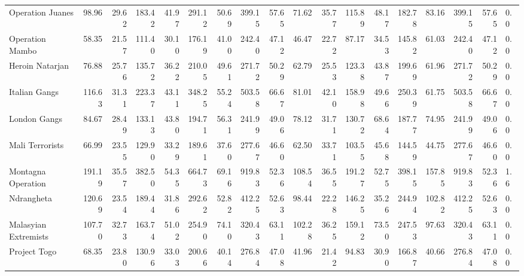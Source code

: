 \begin{tabular}{lrrrrrrrrrrrrrrrrl}
Operation Juanes     &             98.96 &  29.62 &  183.42 &  41.97 &  291.12 &  50.69 &  399.15 &  57.65 &            71.62 &   35.77 &  115.89 &   48.17 &  182.78 &   83.16 &  399.15 &  57.65 &        0.0 \\
Operation Mambo      &             58.35 &  21.57 &  111.40 &  30.10 &  176.19 &  41.00 &  242.40 &  47.12 &            46.47 &   22.72 &   87.17 &   34.53 &  145.82 &   61.03 &  242.40 &  47.12 &        0.0 \\
Heroin Natarjan      &             76.88 &  25.76 &  135.72 &  36.22 &  210.05 &  49.61 &  271.72 &  50.29 &            62.79 &   25.53 &  123.38 &   43.87 &  199.69 &   61.96 &  271.72 &  50.29 &        0.0 \\
Italian Gangs        &            116.63 &  31.31 &  223.37 &  43.11 &  348.25 &  55.24 &  503.58 &  66.67 &            81.01 &   42.10 &  158.98 &   49.66 &  250.39 &   61.75 &  503.58 &  66.67 &        0.0 \\
London Gangs         &             84.67 &  28.49 &  133.13 &  43.80 &  194.71 &  56.31 &  241.99 &  49.06 &            78.12 &   31.71 &  130.72 &   68.64 &  187.77 &   74.95 &  241.99 &  49.06 &        0.0 \\
Mali Terrorists      &             66.99 &  23.55 &  129.90 &  33.29 &  189.61 &  37.60 &  277.67 &  46.60 &            62.50 &   33.71 &  103.55 &   45.68 &  144.59 &   44.75 &  277.67 &  46.60 &        0.0 \\
Montagna Operation   &            191.19 &  35.57 &  382.50 &  54.35 &  664.73 &  69.16 &  919.83 &  52.36 &           108.54 &   36.55 &  191.27 &   52.75 &  398.15 &  157.85 &  919.83 &  52.36 &        1.6 \\
Ndrangheta           &            120.69 &  23.54 &  189.44 &  31.86 &  292.62 &  52.82 &  412.25 &  52.63 &            98.44 &   22.28 &  146.25 &   35.26 &  244.94 &  102.82 &  412.25 &  52.63 &        0.0 \\
Malasyian Extremists &            107.70 &  32.73 &  163.74 &  51.02 &  254.90 &  74.10 &  320.43 &  63.11 &           102.28 &   36.25 &  159.12 &   73.50 &  247.53 &   97.63 &  320.43 &  63.11 &        0.0 \\
Project Togo         &             68.35 &  23.80 &  130.96 &  33.03 &  200.66 &  40.14 &  276.84 &  47.08 &            41.96 &   21.42 &   94.83 &   30.90 &  166.87 &   40.66 &  276.84 &  47.08 &        0.0 \\
\bottomrule
\end{tabular}
